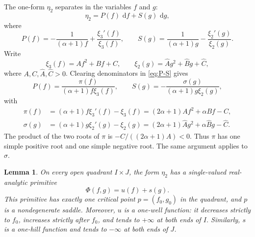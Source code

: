 \documentclass[10pt,reqno]{amsart}
\numberwithin{equation}{section}
\theoremstyle{plain}
\newtheorem{lemma}[theorem]{Lemma}
\theoremstyle{remark}
\newcommand{\dd}{\,\mathrm{d}}
\begin{document}
The one-form $\eta_2$ separates in the variables $f$ and $g$:
\begin{equation}\label{eq:eta2-separated}
  \eta_2=P(f)\,\dd f+S(g)\,\dd g,
\end{equation}
where
\begin{equation}\label{eq:P-S}
  P(f)=-\frac{1}{(\alpha+1)f}+\frac{\xi_3'(f)}{\xi_3(f)},
  \qquad
  S(g)=\frac{1}{(\alpha+1)g}-\frac{\xi_2'(g)}{\xi_2(g)}.
\end{equation}
Write
\[
  \xi_3(f)=Af^2+Bf+C,
  \qquad
  \xi_2(g)=\widehat A g^2+\widehat B g+\widehat C,
\]
where $A,C,\widehat A,\widehat C>0$.  Clearing denominators in
\eqref{eq:P-S} gives
\begin{equation}\label{eq:pi-sigma-quotients}
  P(f)=\frac{\pi(f)}{(\alpha+1)f\xi_3(f)},
  \qquad
  S(g)=-\frac{\sigma(g)}{(\alpha+1)g\xi_2(g)},
\end{equation}
with
\begin{align}
  \pi(f)
    &=(\alpha+1)f\xi_3'(f)-\xi_3(f)
      =(2\alpha+1)Af^2+\alpha Bf-C,
      \label{eq:pi}\\
  \sigma(g)
    &=(\alpha+1)g\xi_2'(g)-\xi_2(g)
      =(2\alpha+1)\widehat A g^2+\alpha\widehat B g-\widehat C.
      \label{eq:sigma}
\end{align}
The product of the two roots of $\pi$ is
$-C/((2\alpha+1)A)<0$.  Thus $\pi$ has one simple positive root and one
simple negative root.  The same argument applies to $\sigma$.

\begin{lemma}\label{lem:saddle}
On every open quadrant $I\times J$, the form $\eta_2$ has a
single-valued real-analytic primitive
\begin{equation}\label{eq:Phi}
  \Phi(f,g)=u(f)+s(g).
\end{equation}
This primitive has exactly one critical point $p=(f_0,g_0)$ in the
quadrant, and $p$ is a nondegenerate saddle.  Moreover, $u$ is a
one-well function: it decreases strictly to $f_0$, increases strictly
after $f_0$, and tends to $+\infty$ at both ends of $I$.  Similarly,
$s$ is a one-hill function and tends to $-\infty$ at both ends of $J$.
\end{lemma}
\end{document}
